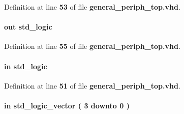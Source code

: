 Definition at line {\bf 53} of file {\bf general\+\_\+periph\+\_\+top.\+vhd}.

\paragraph[{led3\+\_\+g}]{ {\bfseries \textcolor{keywordflow}{out}\textcolor{vhdlchar}{ }} {\bfseries \textcolor{comment}{std\+\_\+logic}\textcolor{vhdlchar}{ }} \hspace{0.3cm}{\ttfamily [Port]}}\label{classgeneral__periph__top_a73b961e0590b093f0c02115db7ae1e58}


Definition at line {\bf 55} of file {\bf general\+\_\+periph\+\_\+top.\+vhd}.

\paragraph[{led3\+\_\+g\+\_\+in}]{ {\bfseries \textcolor{keywordflow}{in}\textcolor{vhdlchar}{ }} {\bfseries \textcolor{comment}{std\+\_\+logic}\textcolor{vhdlchar}{ }} \hspace{0.3cm}{\ttfamily [Port]}}\label{classgeneral__periph__top_a6257e5f4dc27816dbfd342d7df2eb484}


Definition at line {\bf 51} of file {\bf general\+\_\+periph\+\_\+top.\+vhd}.

\paragraph[{led3\+\_\+hw\+\_\+ver}]{ {\bfseries \textcolor{keywordflow}{in}\textcolor{vhdlchar}{ }} {\bfseries \textcolor{comment}{std\+\_\+logic\+\_\+vector}\textcolor{vhdlchar}{ }\textcolor{vhdlchar}{(}\textcolor{vhdlchar}{ }\textcolor{vhdlchar}{ } \textcolor{vhdldigit}{3} \textcolor{vhdlchar}{ }\textcolor{keywordflow}{downto}\textcolor{vhdlchar}{ }\textcolor{vhdlchar}{ } \textcolor{vhdldigit}{0} \textcolor{vhdlchar}{ }\textcolor{vhdlchar}{)}\textcolor{vhdlchar}{ }} \hspace{0.3cm}{\ttfamily [Port]}}\label{classgeneral__periph__top_a6c8c5b4f526548e449d178779af6bd55}


